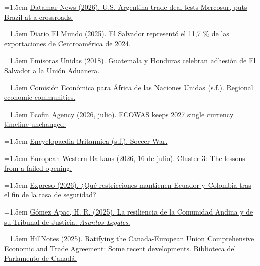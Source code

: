 \documentclass[10pt,a4paper]{article}
\begin{document}
\noindent\hangindent=1.5em \href{https://datamarnews.com/?p=67674}{Datamar News (2026). U.S.-Argentina trade deal tests Mercosur, puts Brazil at a crossroads.}

\noindent\hangindent=1.5em \href{https://diario.elmundo.sv/economia/el-salvador-represento-el-11-7-de-las-exportaciones-de-centroamerica-de-2024}{Diario El Mundo (2025). El Salvador representó el 11,7 \% de las exportaciones de Centroamérica de 2024.}

\noindent\hangindent=1.5em \href{https://emisorasunidas.com/2018/08/20/guatemala-y-honduras-celebran-adhesion-de-el-salvador-a-la-union-aduanera/}{Emisoras Unidas (2018). Guatemala y Honduras celebran adhesión de El Salvador a la Unión Aduanera.}

\noindent\hangindent=1.5em \href{https://archive.uneca.org/oria/pages/regional-economic-communities}{Comisión Económica para África de las Naciones Unidas (s.f.). Regional economic communities.}

\noindent\hangindent=1.5em \href{https://www.ecofinagency.com/news/2207-57598-ecowas-reaffirms-2027-launch-target-for-eco-currency-despite-outstanding-questions}{Ecofin Agency (2026, julio). ECOWAS keeps 2027 single currency timeline unchanged.}

\noindent\hangindent=1.5em \href{https://www.britannica.com/topic/Soccer-War}{Encyclopaedia Britannica (s.f.). Soccer War.}

\noindent\hangindent=1.5em \href{https://europeanwesternbalkans.com/2026/07/16/cluster-3-the-lessons-from-a-failed-opening/}{European Western Balkans (2026, 16 de julio). Cluster 3: The lessons from a failed opening.}

\noindent\hangindent=1.5em \href{https://www.expreso.ec/economia-y-negocios/restricciones-mantienen-ecuador-colombia-tasa-seguridad-284130.html}{Expreso (2026). ¿Qué restricciones mantienen Ecuador y Colombia tras el fin de la tasa de seguridad?}

\noindent\hangindent=1.5em \href{https://www.asuntoslegales.com.co/analisis/hugo-r-gomez-apac-3692247/la-resiliencia-de-la-comunidad-andina-y-de-su-tribunal-de-justicia-4150058}{Gómez Apac, H. R. (2025). La resiliencia de la Comunidad Andina y de su Tribunal de Justicia. \textit{Asuntos Legales}.}

\noindent\hangindent=1.5em \href{https://hillnotes.ca/2025/09/26/ratifying-the-canada-european-union-comprehensive-economic-and-trade-agreement-some-recent-developments/}{HillNotes (2025). Ratifying the Canada-European Union Comprehensive Economic and Trade Agreement: Some recent developments. Biblioteca del Parlamento de Canadá.}
\end{document}
